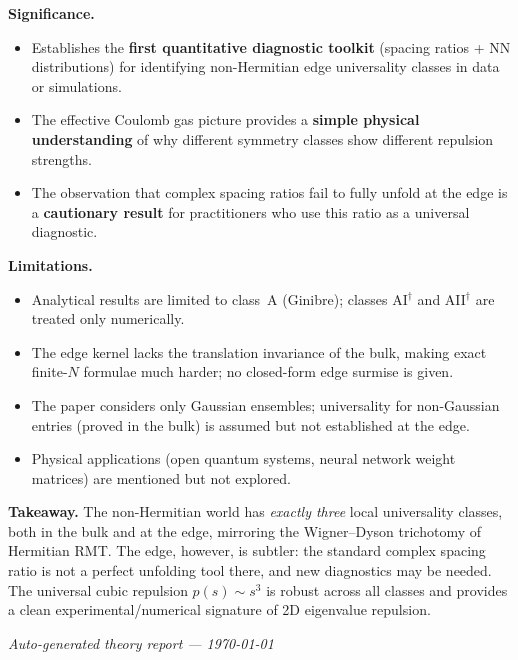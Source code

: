 \documentclass[11pt,a4paper]{article}
\theoremstyle{definition}
\begin{document}
\textbf{Significance.}
\begin{itemize}[nosep]
  \item Establishes the \textbf{first quantitative diagnostic toolkit} (spacing ratios + NN distributions) for identifying non-Hermitian edge universality classes in data or simulations.
  \item The effective Coulomb gas picture provides a \textbf{simple physical understanding} of why different symmetry classes show different repulsion strengths.
  \item The observation that complex spacing ratios fail to fully unfold at the edge is a \textbf{cautionary result} for practitioners who use this ratio as a universal diagnostic.
\end{itemize}

\textbf{Limitations.}
\begin{itemize}[nosep]
  \item Analytical results are limited to class~A (Ginibre); classes AI$^\dagger$ and AII$^\dagger$ are treated only numerically.
  \item The edge kernel lacks the translation invariance of the bulk, making exact finite-$N$ formulae much harder; no closed-form edge surmise is given.
  \item The paper considers only Gaussian ensembles; universality for non-Gaussian entries (proved in the bulk) is assumed but not established at the edge.
  \item Physical applications (open quantum systems, neural network weight matrices) are mentioned but not explored.
\end{itemize}

\textbf{Takeaway.}
The non-Hermitian world has \emph{exactly three} local universality classes, both in the bulk and at the edge, mirroring the Wigner--Dyson trichotomy of Hermitian RMT.
The edge, however, is subtler: the standard complex spacing ratio is not a perfect unfolding tool there, and new diagnostics may be needed.
The universal cubic repulsion $p(s)\sim s^3$ is robust across all classes and provides a clean experimental/numerical signature of 2D eigenvalue repulsion.

\vfill
\begin{center}
\small\textit{Auto-generated theory report --- \today}
\end{center}
\end{document}
